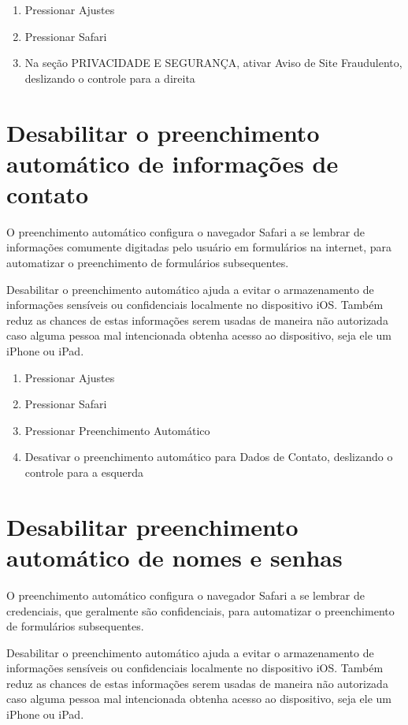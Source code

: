 \begin{enumerate}
\item Pressionar Ajustes
\item Pressionar Safari
\item Na se\c c\~ao PRIVACIDADE E SEGURAN\c CA, ativar Aviso de Site Fraudulento, deslizando o controle para a direita
\end{enumerate}

\section{Desabilitar o preenchimento autom\'atico de informa\c c\~oes de contato}

O preenchimento autom\'atico configura o navegador Safari a se lembrar de informa\c c\~oes comumente digitadas pelo usu\'ario em formul\'arios na internet, para automatizar o preenchimento de formul\'arios subsequentes.

Desabilitar o preenchimento autom\'atico ajuda a evitar o armazenamento de informa\c c\~oes sens\'iveis ou confidenciais localmente no dispositivo iOS. Tamb\'em reduz as chances de estas informa\c c\~oes serem usadas de maneira n\~ao autorizada caso alguma pessoa mal intencionada obtenha acesso ao dispositivo, seja ele um iPhone ou iPad. 

\begin{enumerate}
\item Pressionar Ajustes
\item Pressionar Safari
\item Pressionar Preenchimento Autom\'atico
\item Desativar o preenchimento autom\'atico para Dados de Contato, deslizando o controle para a esquerda
\end{enumerate}

\section{Desabilitar preenchimento autom\'atico de nomes e senhas}

O preenchimento autom\'atico configura o navegador Safari a se lembrar de credenciais, que geralmente s\~ao confidenciais, para automatizar o preenchimento de formul\'arios subsequentes.

Desabilitar o preenchimento autom\'atico ajuda a evitar o armazenamento de informa\c c\~oes sens\'iveis ou confidenciais localmente no dispositivo iOS. Tamb\'em reduz as chances de estas informa\c c\~oes serem usadas de maneira n\~ao autorizada caso alguma pessoa mal intencionada obtenha acesso ao dispositivo, seja ele um iPhone ou iPad. 

